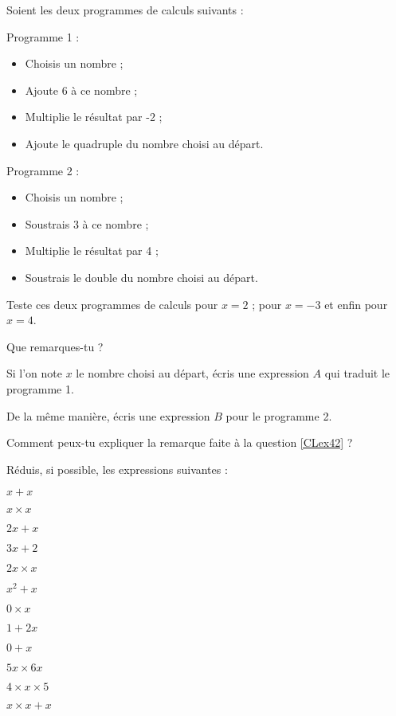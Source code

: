 \begin{exercice}
Soient les deux programmes de calculs suivants :

Programme 1 :
\begin{itemize}
    \item Choisis un nombre ;
    \item Ajoute 6 à ce nombre ;
    \item Multiplie le résultat par -2 ;
    \item Ajoute le quadruple du nombre choisi au départ.
\end{itemize}

Programme 2 :
\begin{itemize}
    \item Choisis un nombre ;
    \item Soustrais 3 à ce nombre ;
    \item Multiplie le résultat par 4 ;
    \item Soustrais le double du nombre choisi au départ.
\end{itemize}

\begin{colenumerate}{1} 
\item Teste ces deux programmes de calculs pour $x = 2$ ; pour $x = -3$ et enfin pour $x = 4$.
\item\label{CLex42} Que remarques-tu ?
\item Si l'on note $x$ le nombre choisi au départ, écris une expression $A$ qui traduit le programme 1. 
\item De la même manière, écris une expression $B$ pour le programme 2.
\item Comment peux-tu expliquer la remarque faite à la question \ref{CLex42} ?
\end{colenumerate} 
\end{exercice}




 





\begin{exercice}
Réduis, si possible, les expressions suivantes :

\begin{colenumerate}{4} 
\item $x + x$
\item $x \times x$
\item $2x + x$
\item $3x + 2$
\item $2x \times x$
\item $x^2 + x$
\item $0 \times x$
\item $1 + 2x$
\item $0 + x$
\item $5x \times 6x$
\item $4 \times x \times 5$
\item $x \times x + x$
\end{colenumerate} 
\end{exercice}

